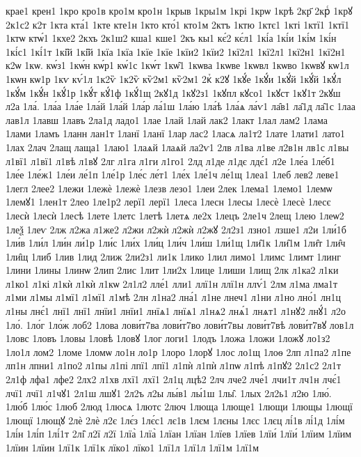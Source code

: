 {крае1
крен1
1кро
кро1в
кро1м
кро1н
1крыв
1кры1м
1крі
1крѡ
1крѣ
2кр҃
2крⷭ
1крꙋ
2к1с2
к2т
1кта
кта́1
1кте
кте1н
1кто
кто́1
кто1м
2ктъ
1ктю
1ктє1
1кті
1ктї1
1ктї1
1ктѡ
ктѡ́1
1кхе2
2кхъ
2к1ш2
кша1
кше1
2къ
кы1
кє́2
кє́л1
1кі́а
1кі́и
1кі́м
1кі́н
1кі́с1
1кі́1т
1кі̑й
1кі̑й
1кїа
1кїа
1кїе
1кїе
1кїи2
1кїи2
1кї2л1
1кї2л1
1кї2н1
1кї2н1
к2ѡ
1кѡ.
кѡ́з1
1кѡ́н
кѡ́р1
кѡ́1с
1кѡ́т
1кѡ̑1
1кѡва
1кѡве
1кѡвл
1кѡво
1кѡвꙋ
кѡ1л
1кѡн
кѡ1р
1кѵ
кѵ́1л
1к2ѷ
1к2ѷ
кѷ2м1
кѷ2м1
2кⷮ
к2ꙋ
1кꙋ́е
1кꙋ́и
1кꙋ́й
1кꙋ́й
1кꙋ́л
1кꙋ́м
1кꙋ́н
1кꙋ́1р
1кꙋ́т
кꙋ́1ф
1кꙋ́1щ
2кꙋ1д
1кꙋ2з1
1кꙋпл
кꙋсо1
1кꙋст
1кꙋ1т
2кꙋш
л2а
1ла́.
1ла́а
1ла́е
1ла́й
1ла́й
1ла́р
ла́1ш
1ла́ю
1ла́ѣ
1ла́ѧ
ла́ѵ1
ла̑в1
ла̑1д
ла̑1с
1лаа
лав1л
1лавш
1лавъ
2ла1д
ладо1
1лае
1лай
1лай
лак2
1лакт
1лал
лам2
1лама
1лами
1ламъ
1ланн
лан1т
1ланї
1ланї
1лар
лас2
1ласѧ
ла1т2
1лате
1лати1
лато1
1лах
2лач
2лащ
лаща1
1лаю1
1лаѧй
1лаѧй
ла2ѵ1
2лв
л1ва
л1ве
л2в1н
лв1с
л1вы
л1вї1
л1вї1
л1вѣ
л1вꙋ
2лг
л1га
л1ги
л1го1
2лд
л1де
л1дє
лдє́1
л2е
1ле́а
1ле́б1
1ле́е
1ле́ж1
1ле́и
ле́1п
1ле́1р
1ле́с
ле́т1
1ле́х
1ле́1ч
ле́1щ
1леа1
1леб
лев2
леве1
1легл
2лее2
1лежи
1лежѐ
1лежѐ
1лезв
лезо1
1леи
2лек
1лема1
1лемо1
1лемѡ
1лемꙋ1
1лен1т
2лео
1ле1р2
лерї1
лерї1
1леса
1лесн
1лесы
1лесѐ
1лесѐ
1лесє
1лесѝ
1лесѝ
1лесѣ
1лете
1летс
1летѣ
1летѧ
ле2х
1лецъ
2ле1ч
2лещ
1лею
1леѡ2
1леѯ
1леѵ
2лж
л2жа
л1же2
л2жи
л2жѝ
л2жѝ
л2жꙋ
2л2з1
лзно1
лзше1
л2и
1ли́1б
1ли́в
1ли́л
1ли́н
ли́1р
1ли́с
1ли́х
1ли́ц
1ли́ч
1ли́ш
1ли́1щ
1ли̑1к
1ли̑1м
1ли̑т
1ли̑ч
1ли̑щ
1либ
1лив
1лид
2лиж
2ли2з1
ли1к
1лико
1лил
лимо1
1лимс
1лимт
1линг
1лини
1лины
1линѡ
2лип
2лис
1лит
1ли2х
1лице
1лиши
1лищ
2лк
л1ка2
л1ки
л1ко1
л1кі
л1кѝ
л1кѝ
л1кѡ
2л1л2
лле́1
лли1
ллї1н
ллї1н
ллѵ́1
2лм
л1ма
лма1т
л1ми
л1мы
л1мї1
л1мї1
л1мѣ
2лн
л1на2
лна́1
л1не
лнеч1
л1ни
л1но
лно́1
лн1ц
л1ны
лнє́1
лнї1
лнї1
лнїи1
лнїи1
лнїѧ1
лнїѧ1
л1нѧ2
лнѧ́1
лнѧт1
л1нꙋ2
лнꙋ́1
л2о
1ло́.
1ло́г
1ло́ж
лоб2
1лова
лови́т7ва
лови́т7во
лови́т7вы
лови́т7вѣ
лови́т7вꙋ
лов1л
1ловс
1ловъ
1ловы
1ловѣ
1ловꙋ
1лог
логи1
1лодъ
1ложа
1ложи
1ложꙋ
ло1з2
1ло1л
лом2
1ломе
1ломѡ
ло1н
ло1р
1лоро
1лорꙋ
1лос
ло1щ
1лоѳ
2лп
л1па2
л1пе
лп1н
лпни1
л1по2
л1пы
л1пі
лпї1
лпї1
л1пѝ
л1пѝ
л1пѡ
л1пѣ
л1пꙋ2
2л1с2
2л1т
2л1ф
лфа1
лфе2
2лх2
л1хв
лхї1
лхї1
2л1ц
лцѣ2
2лч
лче2
лче́1
лчи1т
лч1н
лчє́1
лчї1
лчї1
л1чꙋ1
2л1ш
лшꙋ1
2л2ъ
л2ы
лы́в1
лы́1ш
1лы̑.
1лых
2л2ь1
л2ю
1лю́.
1лю́б
1лю́с
1люб
2люд
1люсѧ
1лютс
2люч
1люща
1люще1
1лющи
1лющы
1лющї
1лющї
1лющꙋ
2лѐ
2лѐ
л2є
1лє́з
1лє́с1
лє1в
1лєм
1лєны
1лєс
1лєц
лі́1в
лі́1д
1лі́м
1лі́н
1лі́п
1лі́1т
2лі̑
л2ї
л2ї
1лїа̀
1лїа̀
1лїан
1лїан
1лїев
1лїев
1лїи́
1лїи́
1лїим
1лїим
1лїин
1лїин
1лї1к
1лї1к
лїко1
лїко1
1лї1л
1лї1л
1лї1м
1лї1м
}
